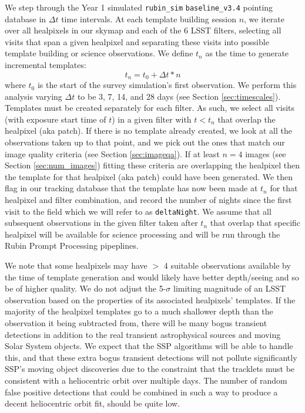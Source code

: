 \documentclass[preprint,linenumbers]{aastex631}
\newcommand{\baseline}{\texttt{baseline\_v3.4}\xspace}
\begin{document}
{		We step through the Year 1 simulated \texttt{rubin\_sim} \baseline pointing database in $\Delta t$ time intervals. At each template building session $n$, we iterate over all healpixels in our skymap and each of  the 6 LSST filters, selecting all visits that span a given healpixel and separating these visits into possible template building or science observations. We define $t_n$ as the time to generate incremental templates:
		\begin{equation}
			t_n= t_0+ \Delta t*n
		\end{equation}
		where $t_0$ is the start of the survey simulation's first observation. We perform this analysis varying $\Delta t$ to be  3, 7, 14, and  28 days (see Section \ref{sec:timescales}). Templates must be created separately for each filter. As such, we select all visits (with exposure start time of $t$)  in a given filter with $t<t_n$ that overlap the healpixel (aka patch). If there is no template already created, we look at all the observations taken up to that point, and we pick out the ones that match our image quality criteria (see Section \ref{sec:imageqa}). If at least $n=4$ images (see Section \ref{sec:num_images}) fitting these criteria are overlapping the healpixel then the template for that healpixel (aka patch) could have been generated. We then flag in our tracking database that the template has now been made at $t_n$ for that healpixel and filter combination, and record the number of nights since the first visit to the field which we will refer to as \texttt{deltaNight}. We assume that all subsequent observations in the given filter taken after $t_n$ that overlap that specific healpixel will be available for science processing and will be run through the Rubin Prompt Processing pipeplines. 
		
		We note that some healpixels may have $>$ 4 suitable observations available by the time of template generation and would likely have better depth/seeing and so be of higher quality. We do not adjust the 5-$\sigma$ limiting magnitude of an LSST observation based on the properties of its associated healpixels' templates. If the majority of the healpixel templates go to a much shallower depth than the observation it being subtracted from, there will be many bogus transient detections in addition to the real transient astrophysical sources and moving Solar System objects. We expect that  the SSP algorithms  will be able to handle this, and that these extra bogus transient detections will not pollute significantly SSP's moving object discoveries due to the constraint that the tracklets must be consistent with a heliocentric orbit over multiple days. The number of random false positive detections that could be combined in such a way to produce a decent heliocentric orbit fit, should be quite low. 
		
}
\end{document}
